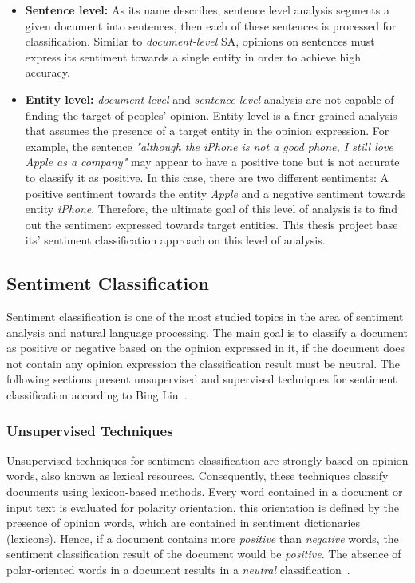 {\begin{itemize}
\item \textbf{Sentence level:} As its name describes, sentence level analysis segments a given document into sentences, then each of these sentences is processed for classification. Similar to \textit{document-level} SA, opinions on sentences must express its sentiment towards a single entity in order to achieve high accuracy. 

\item \textbf{Entity level:} \textit{document-level} and \textit{sentence-level} analysis are not capable of finding the target of peoples’ opinion. Entity-level is a finer-grained analysis that assumes the presence of a target entity in the opinion expression. For example, the sentence \textit{"although the iPhone is not a good phone, I still love Apple as a company"} may appear to have a positive tone but is not accurate to classify it as positive. In this case, there are two different sentiments: A positive sentiment towards the entity \textit{Apple} and a negative sentiment towards entity \textit{iPhone}. Therefore, the ultimate goal of this level of analysis is to find out the sentiment expressed towards target entities. This thesis project base its’ sentiment classification approach on this level of analysis.

\end{itemize}

\subsection{Sentiment Classification}
\label{sec:sentClassification} 

Sentiment classification is one of the most studied topics in the area of sentiment analysis and natural language processing. The main goal is to classify a document as positive or negative based on the opinion expressed in it, if the document does not contain any opinion expression the classification result must be neutral. The following sections present unsupervised and supervised techniques for sentiment classification according to Bing Liu~\cite{liu2012sentiment}.

 

 
 \subsubsection{Unsupervised Techniques}
 
 Unsupervised techniques for sentiment classification are strongly based on opinion words, also known as lexical resources. Consequently, these techniques classify documents using lexicon-based methods. Every word contained in a document or input text is evaluated for polarity orientation, this orientation is defined by the presence of opinion words, which are contained in sentiment dictionaries (lexicons). Hence, if a document contains more \textit{positive} than \textit{negative} words, the sentiment classification result of the document would be \textit{positive}. The absence of polar-oriented words in a document results in a \textit{neutral} classification~\cite[p. 29]{liu2012sentiment}. 
 
}
